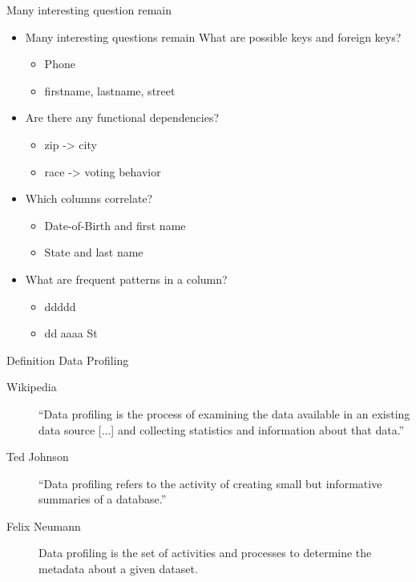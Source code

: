 \documentclass[aspectratio=169]{../latex_main/tntbeamer}  %
\begin{document}
\begin{frame}[c]{Many interesting question remain}

\begin{itemize}
    \item Many interesting questions remain What are possible keys and foreign keys?
    \begin{itemize}
        \item Phone
        \item firstname, lastname, street 
    \end{itemize}
    \item Are there any functional dependencies?
    \begin{itemize}
        \item zip -> city
        \item race -> voting behavior 
    \end{itemize}
    \item Which columns correlate?
    \begin{itemize}
        \item Date-of-Birth and first name 
        \item State and last name
    \end{itemize}
    \item What are frequent patterns in a column?
    \begin{itemize}
        \item ddddd
        \item dd aaaa St
    \end{itemize}

    \end{itemize}

\end{frame}

\begin{frame}[c]{Definition Data Profiling}

\begin{description}
    \item[Wikipedia] ``Data profiling is the process of examining the data available in an existing data source [...] and collecting statistics and information about that data.''
    \item[Ted Johnson] ``Data profiling refers to the activity of creating small but informative summaries of a database.''
    \item[Felix Neumann] Data profiling is the set of activities and processes to determine the metadata about a given dataset.
\end{description}

\end{frame}
\end{document}
